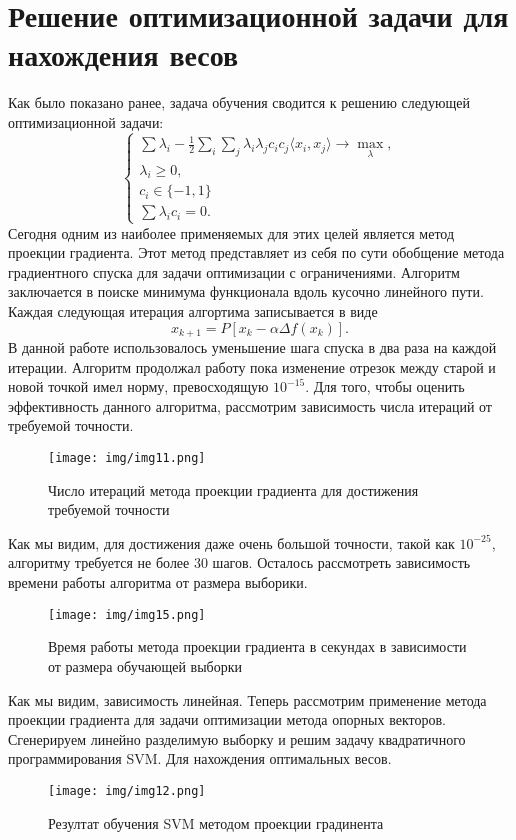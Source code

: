 \documentclass[twoside,twocolumn]{article}
\theoremstyle{plain}
\theoremstyle{definition}
\begin{document}
\section{Решение оптимизационной задачи для нахождения весов}
Как было показано ранее, задача обучения сводится к решению следующей оптимизационной задачи:
\[
\begin{cases}
\sum \lambda_i - \frac{1}{2}\sum_i \sum_j \lambda_i \lambda_j c_i c_j \langle x_i, x_j\rangle \xrightarrow{} \max_{\lambda}, \\
\lambda_i \geq 0, \\
c_i \in \{-1, 1\} \\
\sum \lambda_i c_i = 0.
\end{cases}
\]
Сегодня одним из наиболее применяемых для этих целей является метод проекции градиента. Этот метод представляет из себя по сути обобщение
метода градиентного спуска для задачи оптимизации с ограничениями. Алгоритм заключается в поиске минимума функционала вдоль кусочно линейного пути.
Каждая следующая итерация алгортима записывается в виде
$$
x_{k+1} = P[x_k - \alpha \Delta f(x_k)].
$$
В данной работе использовалось уменьшение шага спуска в два раза на каждой итерации. Алгоритм продолжал работу пока изменение отрезок между старой
и новой точкой имел норму, превосходящую $10^{-15}$. Для того, чтобы оценить эффективность данного алгоритма, рассмотрим зависимость числа
итераций от требуемой точности.
\begin{figure}[!h]
  \caption{Число итераций метода проекции градиента для достижения требуемой точности}
  \centering
  \texttt{[image: img/img11.png]}
  \label{fig:gd}
\end{figure}
Как мы видим, для достижения даже очень большой точности, такой как $10^{-25}$, алгоритму требуется не более 30 шагов. Осталось рассмотреть
зависимость времени работы алгоритма от размера выборики.
\begin{figure}[!h]
  \caption{Время работы метода проекции градиента в секундах в зависимости от размера обучающей выборки}
  \centering
  \texttt{[image: img/img15.png]}
  \label{fig:gd}
\end{figure}
Как мы видим, зависимость линейная. Теперь рассмотрим применение метода проекции градиента для задачи оптимизации метода опорных векторов. Сгенерируем линейно разделимую выборку и решим задачу квадратичного программирования SVM. Для нахождения
оптимальных весов.
\begin{figure}[!h]
  \caption{Резултат обучения SVM методом проекции градинента}
  \centering
  \texttt{[image: img/img12.png]}
  \label{fig:gd}
\end{figure}
\end{document}
